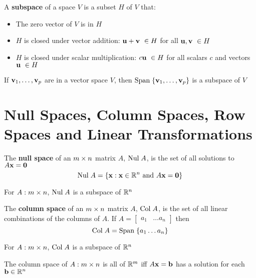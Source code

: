 \documentclass{report}
\begin{document}
\begin{definition}
    A \textbf{subspace} of a space $V$ is a subset $H$ of $V$ that:
    \begin{itemize}
        \item The zero vector of $V$ is in $H$
        \item $H$ is closed under vector addition: $\uu + \vv \ \in H$ for all $\mathbf{u}, \mathbf{v} \ \in H$
        \item $H$ is closed under scalar multiplication: $c\uu \ \in H$ for all scalars $c$ and vectors $\mathbf{u}\ \in H$
    \end{itemize}
\end{definition}

\begin{theorem}
    If $\mathbf{v}_1, \ldots, \mathbf{v}_p$ are in a vector space $V$, then $\mathrm{Span}\; \{\mathbf{v}_1, \ldots, \mathbf{v}_p\}$ is a subspace of $V$
\end{theorem}

\section{Null Spaces, Column Spaces, Row Spaces and Linear Transformations}

\begin{definition}
    The \textbf{null space} of an $m \times n$ matrix $A$, $\mathrm{Nul}\; A$, is the set of all solutions to $A\mathbf{x} = \mathbf{0}$
    \[\mathrm{Nul}\; A = \{\mathbf{x} : \mathbf{x} \in \mathbb{R}^n \text{ and } A \mathbf{x} = \mathbf{0}\}\]
\end{definition}

\begin{theorem}
    For $A: m \times n$, $\mathrm{Nul}\; A$ is a subspace of $\mathbb{R}^n$
\end{theorem}

\begin{definition}
    The \textbf{column space} of an $m \times n$ matrix $A$, $\mathrm{Col}\; A$, is the
    set of all linear combinations of the columns of $A$. If $A = \begin{bmatrix}
        a_1 & \dots a_n
    \end{bmatrix}$ then \[
    \mathrm{Col}\; A = \mathrm{Span}\; \{a_1 \ldots a_n\}
    \]
\end{definition}

\begin{theorem}
    For $A: m \times n$, $\mathrm{Col}\; A$ is a subspace of $\mathbb{R}^n$
\end{theorem}

The column space of $A: m \times n$ is all of $\mathbb{R}^m$ iff $A\mathbf{x}=\mathbf{b}$ has a solution for each $\mathbf{b} \in \mathbb{R}^n$
\end{document}
